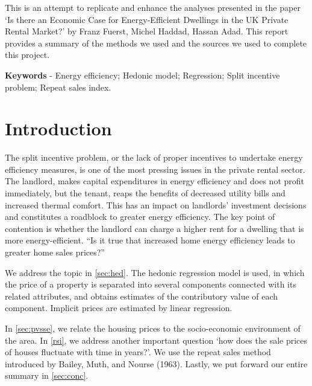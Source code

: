 \documentclass[12pt]{article}
\author{ABSTRACT}
\date{ }
\begin{document}
\setlength{\headheight}{14.49998pt}

\newpage

\maketitle

This is an attempt to replicate and enhance the analyses presented in the paper `Is there an Economic Case for Energy-Efficient Dwellings in the UK Private Rental Market?' by Franz Fuerst, Michel Haddad, Hassan Adad. This report provides a summary of the methods we used and the sources we used to complete this project.

\textbf{Keywords} - Energy efficiency; Hedonic model; Regression; Split incentive problem; Repeat sales index.
\newpage
\tableofcontents
\newpage
\section{Introduction}
The split incentive problem, or the lack of proper incentives to undertake energy efficiency measures, is one of the most pressing issues in the private rental sector. The landlord, makes capital expenditures in energy efficiency and does not profit immediately, but the tenant, reaps the benefits of decreased utility bills and increased thermal comfort. This has an impact on landlords' investment decisions and constitutes a roadblock to greater energy efficiency. The key point of contention is whether the landlord can charge a higher rent for a dwelling that is more energy-efficient. ``Is it true that increased home energy efficiency leads to greater home sales prices?''

We address the topic in \autoref{sec:hed}. The hedonic regression model is used, in which the price of a property is separated into several components connected with its related attributes, and obtains estimates of the contributory value of each component. Implicit prices are estimated by linear regression.

In \autoref{sec:pvsse}, we relate the housing prices to the socio-economic environment of the area. In \autoref{rsi}, we address another important question `how does the sale prices of houses fluctuate with time in years?'. We use the repeat sales method introduced by Bailey, Muth, and Nourse (1963). Lastly, we put forward our entire summary in \autoref{sec:conc}.
\end{document}
